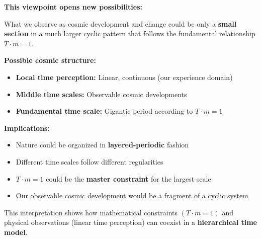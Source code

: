 	\textbf{This viewpoint opens new possibilities:}
	
	What we observe as cosmic development and change could be only a \textbf{small section} in a much larger cyclic pattern that follows the fundamental relationship $T \cdot m = 1$.
	
	\textbf{Possible cosmic structure:}
	\begin{itemize}
		\item \textbf{Local time perception:} Linear, continuous (our experience domain)
		\item \textbf{Middle time scales:} Observable cosmic developments
		\item \textbf{Fundamental time scale:} Gigantic period according to $T \cdot m = 1$
	\end{itemize}
	
	\textbf{Implications:}
	\begin{itemize}
		\item Nature could be organized in \textbf{layered-periodic} fashion
		\item Different time scales follow different regularities
		\item $T \cdot m = 1$ could be the \textbf{master constraint} for the largest scale
		\item Our observable cosmic development would be a fragment of a cyclic system
	\end{itemize}
	
	This interpretation shows how mathematical constraints $(T \cdot m = 1)$ and physical observations (linear time perception) can coexist in a \textbf{hierarchical time model}.
	